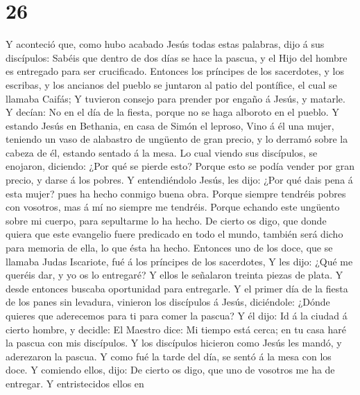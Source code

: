 \hypertarget{section-25}{%
\section{26}\label{section-25}}

 Y aconteció que, como hubo acabado Jesús todas estas
palabras, dijo á sus discípulos:  Sabéis que dentro de dos
días se hace la pascua, y el Hijo del hombre es entregado para ser
crucificado.  Entonces los príncipes de los sacerdotes, y
los escribas, y los ancianos del pueblo se juntaron al patio del
pontífice, el cual se llamaba Caifás;  Y tuvieron consejo
para prender por engaño á Jesús, y matarle.  Y decían: No
en el día de la fiesta, porque no se haga alboroto en el pueblo.
 Y estando Jesús en Bethania, en casa de Simón el leproso,
 Vino á él una mujer, teniendo un vaso de alabastro de
ungüento de gran precio, y lo derramó sobre la cabeza de él, estando
sentado á la mesa.  Lo cual viendo sus discípulos, se
enojaron, diciendo: ¿Por qué se pierde esto?  Porque esto
se podía vender por gran precio, y darse á los pobres.  Y
entendiéndolo Jesús, les dijo: ¿Por qué dais pena á esta mujer? pues ha
hecho conmigo buena obra.  Porque siempre tendréis pobres
con vosotros, mas á mí no siempre me tendréis.  Porque
echando este ungüento sobre mi cuerpo, para sepultarme lo ha hecho.
 De cierto os digo, que donde quiera que este evangelio
fuere predicado en todo el mundo, también será dicho para memoria de
ella, lo que ésta ha hecho.  Entonces uno de los doce,
que se llamaba Judas Iscariote, fué á los príncipes de los sacerdotes,
 Y les dijo: ¿Qué me queréis dar, y yo os lo entregaré? Y
ellos le señalaron treinta piezas de plata.  Y desde
entonces buscaba oportunidad para entregarle.  Y el
primer día de la fiesta de los panes sin levadura, vinieron los
discípulos á Jesús, diciéndole: ¿Dónde quieres que aderecemos para ti
para comer la pascua?  Y él dijo: Id á la ciudad á cierto
hombre, y decidle: El Maestro dice: Mi tiempo está cerca; en tu casa
haré la pascua con mis discípulos.  Y los discípulos
hicieron como Jesús les mandó, y aderezaron la pascua.  Y
como fué la tarde del día, se sentó á la mesa con los doce.
 Y comiendo ellos, dijo: De cierto os digo, que uno de
vosotros me ha de entregar.  Y entristecidos ellos en
